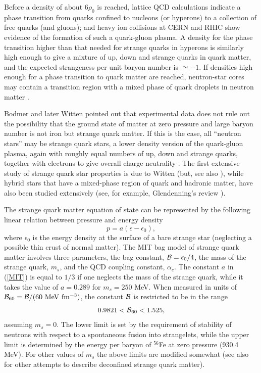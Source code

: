 \documentclass[12pt]{article}
\begin{document}
Before a density of about 6$\rho_0$ is reached, lattice QCD
calculations indicate a phase transition from quarks confined to
nucleons (or hyperons) to a collection of free quarks (and gluons); and
heavy ion collisions at CERN and RHIC show evidence of the formation of
such a quark-gluon plasma. A density for the phase transition 
higher than that needed for strange quarks in hyperons is similarly high 
enough to give a mixture of up, down and strange quarks in quark matter, 
and the expected strangeness per unit baryon number is $\simeq -1$.  
If densities high enough for a phase transition to quark matter are 
reached, neutron-star cores may contain a transition region with a 
mixed phase of quark droplets in neutron matter \cite{Glendenning97}.   

Bodmer \cite{Bodmer71} and later Witten \cite{Witten84}  
pointed out that experimental data does not rule out the possibility
that the  ground state of matter at zero pressure and large baryon number
is not iron but strange quark matter.  If this is the case, all 
``neutron stars'' may be strange quark stars, a lower density version 
of the quark-gluon plasma, again with roughly equal numbers of 
up, down and strange quarks, together with electrons to give 
overall charge neutrality \cite{Bodmer71,Farhi84}.  The first extensive
study of strange quark star properties is due to Witten
\cite{Witten84} (but, see also \cite{Ipser75,Brecher76}), while 
hybrid stars that have a mixed-phase region of quark and 
hadronic matter, have also been studied extensively (see, for example,
Glendenning's review \cite{Glendenning97}).

The strange quark matter equation of state can be represented by the
following linear relation between pressure and energy density
\begin{equation}
p=a(\epsilon-\epsilon_0),
\label{MIT}
\end{equation}
where $\epsilon_0$ is the energy density at the surface of a bare
strange star (neglecting a possible thin crust of normal matter).  The
MIT bag model of strange quark matter involves three parameters, the
bag constant, ${\cal B}=\epsilon_0/4$, the mass of the strange quark,
$m_s$, and the QCD coupling constant, $\alpha_c$.  The constant $a$ in
(\ref{MIT}) is equal to $1/3$ if one neglects the mass of the strange
quark, while it takes the value of $a=0.289$ for $m_s=250$ MeV. When
measured in units of ${\cal B}_{60}={\cal B}/(60~{\rm MeV~fm^{-3}})$,
the constant ${\cal B}$ is restricted to be in the range
\begin{equation}
0.9821<{\cal B}_{60}<1.525,
\end{equation}
assuming $m_s=0$.  
The lower limit is set by the requirement of
stability of neutrons with respect to a spontaneous fusion into
strangelets, while the upper limit is determined by the energy per
baryon of ${}^{56}$Fe at zero pressure (930.4 MeV).  For other values
of $m_s$ the above limits are modified somewhat (see also 
\cite{Dey98,Gondek00} for other attempts to describe deconfined 
strange quark matter).
\end{document}
